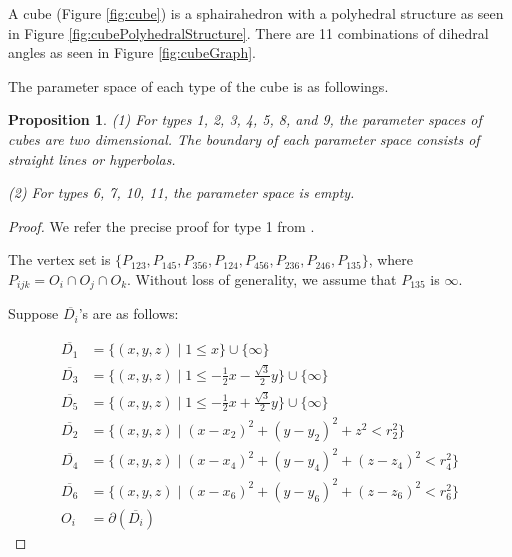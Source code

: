 \documentclass[suppldata, dvipdfmx]{interact}
\theoremstyle{plain}%
\newtheorem{lemma}[theorem]{Lemma}
\newtheorem{proposition}[theorem]{Proposition}
\theoremstyle{definition}
\theoremstyle{remark}
\theoremstyle{problemstyle}
\begin{document}



A cube (Figure \ref{fig:cube}) is a sphairahedron with a polyhedral structure as seen in Figure \ref{fig:cubePolyhedralStructure}.  There are 11 combinations of dihedral angles as seen in Figure \ref{fig:cubeGraph}.

The parameter space of each type of the cube is as followings.

\begin{proposition}\label{prop:paraSpace_cube}
(1) For types 1, 2, 3, 4, 5, 8, and 9, the parameter spaces of cubes are two dimensional.  The boundary of each parameter space consists of straight lines or hyperbolas. \par  
(2) For types 6, 7, 10, 11, the parameter space is empty.
\end{proposition}

\begin{proof}
We refer the precise proof for type 1 from \cite{AharaAraki2}.

The vertex set is $\{ P_{123}, P_{145}, P_{356}, P_{124}, P_{456}, P_{236}, P_{246}, P_{135} \}$, where $P_{ijk} = O_i \cap O_j \cap O_k$.  Without loss of generality, we assume that $P_{135}$ is $\infty$. 

Suppose $\overline{D_i}$'s are as follows:

\begin{align*}
\overline{D_1}&= \{ (x,y,z) \mid 1 \le x \} \cup \{ \infty \}\\
\overline{D_3}&=\{(x,y,z) \mid 1 \le -\frac{1}{2}x-\frac{\sqrt{3}}{2}y \} \cup\{\infty\}\\
\overline{D_5}&=\{(x,y,z) \mid 1 \le -\frac{1}{2}x+\frac{\sqrt{3}}{2}y \} \cup\{\infty\}\\
\overline{D_2}&=\{(x,y,z) \mid (x-x_2)^2+(y-y_2)^2+z^2<r_2^2 \} \\
\overline{D_4}&=\{(x,y,z) \mid (x-x_4)^2+(y-y_4)^2+(z-z_4)^2<r_4^2 \} \\
\overline{D_6}&=\{(x,y,z) \mid (x-x_6)^2+(y-y_6)^2+(z-z_6)^2<r_6^2 \} \\
O_i &= \partial(\overline{D_i})
\end{align*}
\end{proof}
\end{document}
